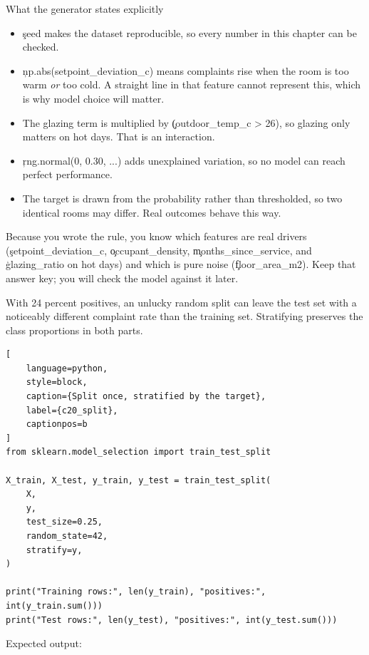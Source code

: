 \begin{SyntaxBox}{What the generator states explicitly}
\begin{itemize}
    \item \c{seed} makes the dataset reproducible, so every number in this
          chapter can be checked.
    \item \c{np.abs(setpoint_deviation_c)} means complaints rise when the room
          is too warm \emph{or} too cold. A straight line in that feature cannot
          represent this, which is why model choice will matter.
    \item The glazing term is multiplied by \c{(outdoor_temp_c > 26)}, so glazing
          only matters on hot days. That is an interaction.
    \item \c{rng.normal(0, 0.30, ...)} adds unexplained variation, so no model
          can reach perfect performance.
    \item The target is drawn from the probability rather than thresholded, so
          two identical rooms may differ. Real outcomes behave this way.
\end{itemize}
Because you wrote the rule, you know which features are real drivers
(\c{setpoint_deviation_c}, \c{occupant_density}, \c{months_since_service}, and
\c{glazing_ratio} on hot days) and which is pure noise (\c{floor_area_m2}).
Keep that answer key; you will check the model against it later.
\end{SyntaxBox}


With 24 percent positives, an unlucky random split can leave the test set with a
noticeably different complaint rate than the training set. Stratifying preserves
the class proportions in both parts.

\begin{lstlisting}[
    language=python,
    style=block,
    caption={Split once, stratified by the target},
    label={c20_split},
    captionpos=b
]
from sklearn.model_selection import train_test_split

X_train, X_test, y_train, y_test = train_test_split(
    X,
    y,
    test_size=0.25,
    random_state=42,
    stratify=y,
)

print("Training rows:", len(y_train), "positives:", int(y_train.sum()))
print("Test rows:", len(y_test), "positives:", int(y_test.sum()))
\end{lstlisting}

Expected output:


